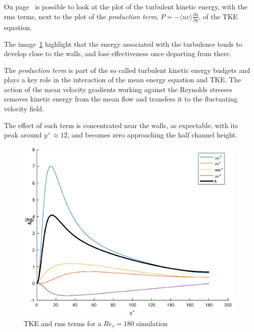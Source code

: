 On page~\pageref{k+budgets:180} is possible to look at the plot of the turbulent kinetic energy, with the rms terms, next to the plot of the \emph{production term}, $P=-\langle uv\rangle \frac{\partial{\bar{u}}}{\partial{y}}$, of the TKE equation.\par
The image~\ref{k+budgets:180} highlight that the energy associated with the turbulence tends to develop close to the walls, and lose effectiveness once departing from there.\par
The \emph{production term} is part of the so called turbulent kinetic energy budgets and plays a key role in the interaction of the mean energy equation and TKE. The action of the mean velocity gradients working against the Reynolds stresses removes kinetic energy from the mean flow and transfers it to the fluctuating velocity field. \par
The effect of such term is concentrated near the walls, as expectable, with its peak around $y^{+} \approx 12$, and becomes zero approaching the half channel height. 

\begin{figure}
\begin{center}
\includegraphics[scale=0.55]{grafici/budget+k_180.eps}
\caption{TKE and rms terms for a $Re_{\tau}=180$ simulation}
\label{k+budgets:180}
\end{center} 
\end{figure}

